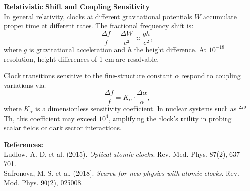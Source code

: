 \begin{technical}
\textbf{Relativistic Shift and Coupling Sensitivity}\\[0.5em]
In general relativity, clocks at different gravitational potentials $W$ accumulate proper time at different rates. The fractional frequency shift is:
\[
\frac{\Delta f}{f} = \frac{\Delta W}{c^2} \approx \frac{gh}{c^2},
\]
where $g$ is gravitational acceleration and $h$ the height difference. At $10^{-18}$ resolution, height differences of 1 cm are resolvable.

Clock transitions sensitive to the fine-structure constant $\alpha$ respond to coupling variations via:
\[
\frac{\Delta f}{f} = K_\alpha \cdot \frac{\Delta \alpha}{\alpha},
\]
where $K_\alpha$ is a dimensionless sensitivity coefficient. In nuclear systems such as $^{229}$Th, this coefficient may exceed $10^4$, amplifying the clock’s utility in probing scalar fields or dark sector interactions.

\vspace{0.5em}
\textbf{References:}\\
Ludlow, A. D. et al. (2015). \textit{Optical atomic clocks}. Rev. Mod. Phys. 87(2), 637–701.\\
Safronova, M. S. et al. (2018). \textit{Search for new physics with atomic clocks}. Rev. Mod. Phys. 90(2), 025008.
\end{technical}
